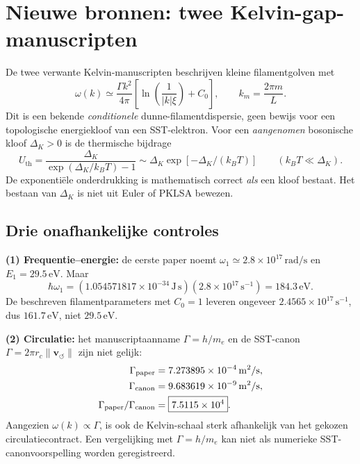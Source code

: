 \documentclass[10pt,a4paper]{article}
\newcommand{\vswirl}{\mathbf{v}_{\!\boldsymbol{\circlearrowleft}}}
\begin{document}
\section{Nieuwe bronnen: twee Kelvin-gap-manuscripten}
De twee verwante Kelvin-manuscripten beschrijven kleine filamentgolven met
\begin{equation}
\omega(k)\simeq\frac{\Gamma k^2}{4\pi}\left[\ln\!\left(\frac1{|k|\xi}\right)+C_0\right], \qquad k_m=\frac{2\pi m}{L}.
\end{equation}
Dit is een bekende \emph{conditionele} dunne-filamentdispersie, geen bewijs voor een topologische energiekloof van een SST-elektron. Voor een \emph{aangenomen} bosonische kloof \(\Delta_K>0\) is de thermische bijdrage
\begin{equation}
U_{\mathrm{th}}=\frac{\Delta_K}{\exp(\Delta_K/k_BT)-1}\sim \Delta_K \exp[-\Delta_K/(k_BT)] \qquad (k_BT\ll\Delta_K).
\end{equation}
De exponenti\"ele onderdrukking is mathematisch correct \emph{als} een kloof bestaat. Het bestaan van \(\Delta_K\) is niet uit Euler of PKLSA bewezen.

\subsection*{Drie onafhankelijke controles}
\textbf{(1) Frequentie--energie:} de eerste paper noemt \(\omega_1\simeq2.8\times10^{17}\,\mathrm{rad/s}\) en \(E_1=29.5\,\mathrm{eV}\). Maar
\begin{equation}
\hbar\omega_1= (1.054571817\times10^{-34}\,\mathrm{J\,s})(2.8\times10^{17}\,\mathrm{s^{-1}})
=\boxed{184.3\,\mathrm{eV}}.
\end{equation}
De beschreven filamentparameters met \(C_0=1\) leveren ongeveer \(2.4565\times10^{17}\,\mathrm{s^{-1}}\), dus \(161.7\,\mathrm{eV}\), niet \(29.5\,\mathrm{eV}\).

\textbf{(2) Circulatie:} het manuscriptaanname \(\Gamma=h/m_e\) en de SST-canon \(\Gamma=2\pi r_c\|\vswirl\|\) zijn niet gelijk:
\begin{align}
\Gamma_{\rm paper}&=7.273895\times10^{-4}\,\mathrm{m^2/s},\\
\Gamma_{\rm canon}&=9.683619\times10^{-9}\,\mathrm{m^2/s},\\
\Gamma_{\rm paper}/\Gamma_{\rm canon}&=\boxed{7.5115\times10^4}.
\end{align}
Aangezien \(\omega(k)\propto\Gamma\), is ook de Kelvin-schaal sterk afhankelijk van het gekozen circulatiecontract. Een vergelijking met \(\Gamma=h/m_e\) kan niet als numerieke SST-canonvoorspelling worden geregistreerd.
\end{document}
